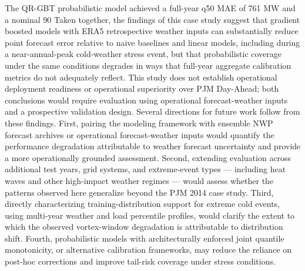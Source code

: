 The QR-GBT probabilistic model achieved a full-year q50 MAE of 761 MW and a nominal 90%
Taken together, the findings of this case study suggest that gradient boosted models with ERA5 retrospective weather inputs can substantially reduce point forecast error relative to naive baselines and linear models, including during a near-annual-peak cold-weather stress event, but that probabilistic coverage under the same conditions degrades in ways that full-year aggregate calibration metrics do not adequately reflect. This study does not establish operational deployment readiness or operational superiority over PJM Day-Ahead; both conclusions would require evaluation using operational forecast-weather inputs and a prospective validation design. Several directions for future work follow from these findings. First, pairing the modeling framework with ensemble NWP forecast archives or operational forecast-weather inputs would quantify the performance degradation attributable to weather forecast uncertainty and provide a more operationally grounded assessment. Second, extending evaluation across additional test years, grid systems, and extreme-event types — including heat waves and other high-impact weather regimes — would assess whether the patterns observed here generalize beyond the PJM 2014 case study. Third, directly characterizing training-distribution support for extreme cold events, using multi-year weather and load percentile profiles, would clarify the extent to which the observed vortex-window degradation is attributable to distribution shift. Fourth, probabilistic models with architecturally enforced joint quantile monotonicity, or alternative calibration frameworks, may reduce the reliance on post-hoc corrections and improve tail-risk coverage under stress conditions.